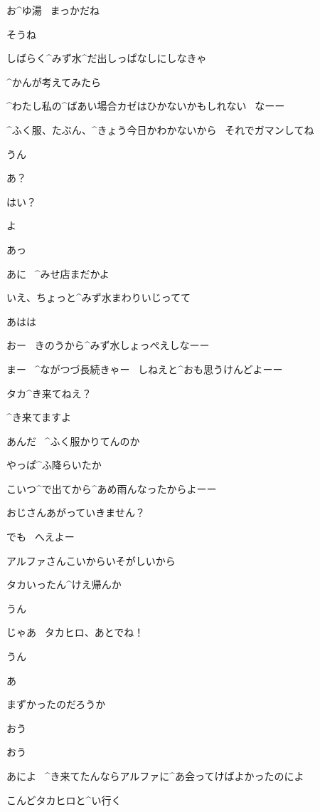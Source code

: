 \page[119]
\Takahiro お^{ゆ}{湯}
\ まっかだね

\Alpha そうね

\Alpha しばらく^{みず}{水}^{だ}{出}しっぱなしにしなきゃ

\Alpha ^{かんが}{考}えてみたら

\Alpha ^{わたし}{私}の^{ばあい}{場合}カゼはひかないかもしれない
\ なーー

\page[120]
\Alpha ^{ふく}{服}、たぶん、^{きょう}{今日}かわかないから
\ それでガマンしてね

\Takahiro うん

\Alpha あ？

\page[121]
\Alpha はい？

\Ojisan よ

\Alpha あっ

\Ojisan あに
\ ^{みせ}{店}まだかよ

\Alpha いえ、ちょっと^{みず}{水}まわりいじってて

\Alpha あはは

\Ojisan おー
\ きのうから^{みず}{水}しょっぺえしなーー

\Ojisan まー
\ ^{ながつづ}{長続}きゃー
\ しねえと^{おも}{思}うけんどよーー

\Ojisan タカ^{き}{来}てねえ？

\page[122]
\Alpha ^{き}{来}てますよ

\Ojisan あんだ
\ ^{ふく}{服}かりてんのか

\Ojisan やっぱ^{ふ}{降}らいたか

\Ojisan こいつ^{で}{出}てから^{あめ}{雨}んなったからよーー

\Alpha おじさんあがっていきません？

\Ojisan でも
\ へえよー

\Ojisan アルファさんこいからいそがしいから

\Ojisan タカいったん^{けえ}{帰}んか

\Takahiro うん

\page[123]
\Alpha じゃあ
\ タカヒロ、あとでね！

\Takahiro うん

\Alpha あ

\Alpha まずかったのだろうか

\page[124]
\Takahiro おう

\Makki おう

\page[125]
\Takahiro あによ
\ ^{き}{来}てたんならアルファに^{あ}{会}ってけばよかったのによ

\Makki こんどタカヒロと^{い}{行}く

